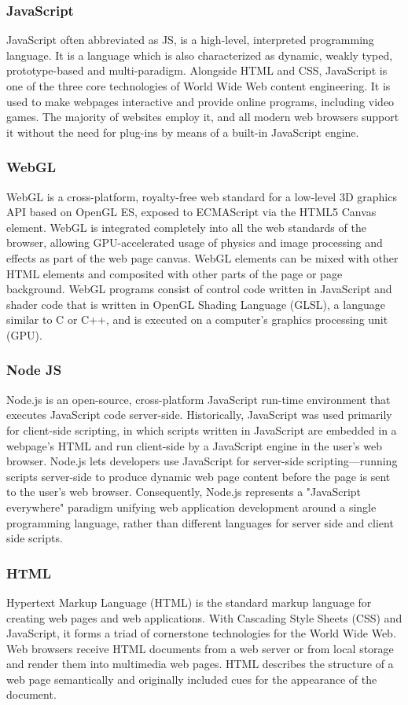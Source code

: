 \documentclass[BTech]{srmuthesis}
\begin{document}
\subsubsection{JavaScript}
JavaScript often abbreviated as JS, is a high-level, interpreted programming language. It is a language which is also characterized as dynamic, weakly typed, prototype-based and multi-paradigm. Alongside HTML and CSS, JavaScript is one of the three core technologies of World Wide Web content engineering. It is used to make webpages interactive and provide online programs, including video games. The majority of websites employ it, and all modern web browsers support it without the need for plug-ins by means of a built-in JavaScript engine.
\subsubsection{WebGL}
WebGL is a cross-platform, royalty-free web standard for a low-level 3D graphics API based on OpenGL ES, exposed to ECMAScript via the HTML5 Canvas element. WebGL is integrated completely into all the web standards of the browser, allowing GPU-accelerated usage of physics and image processing and effects as part of the web page canvas. WebGL elements can be mixed with other HTML elements and composited with other parts of the page or page background. WebGL programs consist of control code written in JavaScript and shader code that is written in OpenGL Shading Language (GLSL), a language similar to C or C++, and is executed on a computer's graphics processing unit (GPU). 
\subsubsection{Node JS}
Node.js is an open-source, cross-platform JavaScript run-time environment that executes JavaScript code server-side. Historically, JavaScript was used primarily for client-side scripting, in which scripts written in JavaScript are embedded in a webpage's HTML and run client-side by a JavaScript engine in the user's web browser. Node.js lets developers use JavaScript for server-side scripting—running scripts server-side to produce dynamic web page content before the page is sent to the user's web browser. Consequently, Node.js represents a "JavaScript everywhere" paradigm unifying web application development around a single programming language, rather than different languages for server side and client side scripts.
\subsubsection{HTML}
Hypertext Markup Language (HTML) is the standard markup language for creating web pages and web applications. With Cascading Style Sheets (CSS) and JavaScript, it forms a triad of cornerstone technologies for the World Wide Web. Web browsers receive HTML documents from a web server or from local storage and render them into multimedia web pages. HTML describes the structure of a web page semantically and originally included cues for the appearance of the document.
\end{document}
